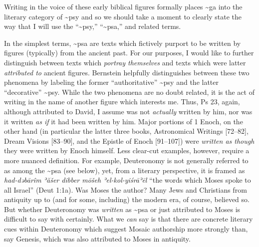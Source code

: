 Writing in the voice of these early biblical figures formally places
\textasciitilde{}ga into the literary category of \textasciitilde{}psy
and so we should take a moment to clearly state the way that I will use
the ``\textasciitilde{}psy,'' ``\textasciitilde{}psa,'' and related
terms.\autocites[The topic of \textasciitilde{}psy has received a large
amount of very sophisticated attention in recent years. See
especially][]{mroczek2016}{tigchelaar_tigchelaar2014}{reed_towsend-moulie2011}{reed_jts2009}{reed_ditomasso-turcescu2008}{najman_hilhorst-puech2007}{najman2003}

In the simplest terms, \textasciitilde{}psa are texts which fictively
purport to be written by figures (typically) from the ancient past. For
our purposes, I would like to further distinguish between texts which
\emph{portray themselves} and texts which were latter \emph{attributed
to} ancient figures. Bernstein helpfully distinguishes between these two
phenomena by labeling the former ``authoritative'' \textasciitilde{}psy
and the latter ``decorative'' \textasciitilde{}psy.\autocite[He also
identifies a third form, ``convenient'' \textasciitilde{}psy which is
located somewhere between the two. I do not find this category as
helpful.][3--7]{bernstein_chazon-etal1999} While the two phenomena are
no doubt related, it is the act of writing in the name of another figure
which interests me. Thus, Ps 23, again, although attributed to David, I
assume was not \emph{actually} written by him, nor was it written
\emph{as if} it had been written by him. Major portions of 1 Enoch, on
the other hand (in particular the latter three books, Astronomical
Writings {[}72--82{]}, Dream Visions {[}83--90{]}, and the Epistle of
Enoch {[}91--107{]}) were \emph{written as though} they were written by
Enoch himself. Less clear-cut examples, however, require a more nuanced
definition. For example, Deuteronomy is not generally referred to as
among the \textasciitilde{}psa (see below), yet, from a literary
perspective, it is framed as \emph{had-dəbārîm ʾăšer dibber mōšeh
ʾel-kol-yiśrāʾēl} ``the words which Moses spoke to all Israel'' (Deut
1:1a). Was Moses the author? Many Jews and Christians from antiquity up
to (and for some, including) the modern era, of course, believed so. But
whether Deuteronomy was \emph{written} as \textasciitilde{}psa or just
attributed to Moses is difficult to say with certainly. What we
\emph{can} say is that there are concrete literary cues within
Deuteronomy which suggest Mosaic authorship more strongly than, say
Genesis, which was also attributed to Moses in antiquity.

